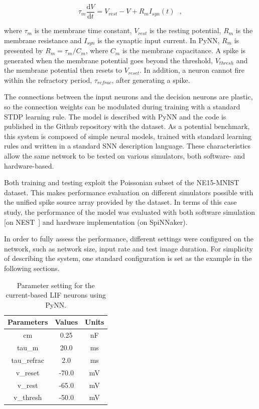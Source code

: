 \documentclass{frontiersENG} %
\def\D{\mathrm{d}}
\begin{document}
\begin{equation}
\tau_m \frac{\D V}{\D t}=V_{rest} - V + R_{m} I_{syn}(t) ~~~,
\label{eq:LIF}
\end{equation}

where $\tau_m$ is the membrane time constant, $ V_{rest} $ is the resting potential, $ R_{m} $ is the membrane resistance and $ I_{syn} $ is the synaptic input current.
In PyNN, $ R_{m} $ is presented by $ R_{m}=\tau_m/C_{m} $, where $C_{m} $ is the membrane capacitance.
A spike is generated when the membrane potential goes beyond the threshold, $ V_{thresh} $ and the membrane potential then resets to $V_{reset}$.
In addition, a neuron cannot fire within the refractory period, $ \tau_{refrac} $, after generating a spike.

The connections between the input neurons and the decision neurons are plastic, so the connection weights can be modulated during training with a standard STDP learning rule.
The model is described with PyNN and the code is published in
the Github repository with the dataset.
As a potential benchmark, this system is composed of simple neural models, trained with standard learning rules and written in a standard SNN description language. These characteristics allow the same network to be tested on various simulators, both software- and hardware-based.

Both training and testing exploit the Poissonian subset of the NE15-MNIST dataset.
This makes performance evaluation on different simulators possible with the unified spike source array provided by the dataset. 
In terms of this case study, the performance of the model was evaluated with both software simulation [on NEST~\citep{gewaltig2007nest}] and hardware implementation (on SpiNNaker).

In order to fully assess the performance, different settings were configured on the network, such as network size, input rate and test image duration.
For simplicity of describing the system, one standard configuration is set as the example in the following sections.

\begin{table}[hbbp]
	\centering
	\caption{\label{tbl:pynnSetting}Parameter setting for the current-based LIF neurons using PyNN.}
	\bgroup
	\def\arraystretch{1.4}
	\begin{tabular}{c c c}
		Parameters & Values & Units \\
		\hline
		cm & 0.25 & nF	\\
		tau\_m & 20.0 & ms\\
		tau\_refrac & 2.0 & ms\\
		v\_reset & -70.0 & mV\\
		v\_rest & -65.0 & mV\\
		v\_thresh & -50.0 & mV\\
	\end{tabular}
	\egroup
\end{table}
\end{document}
